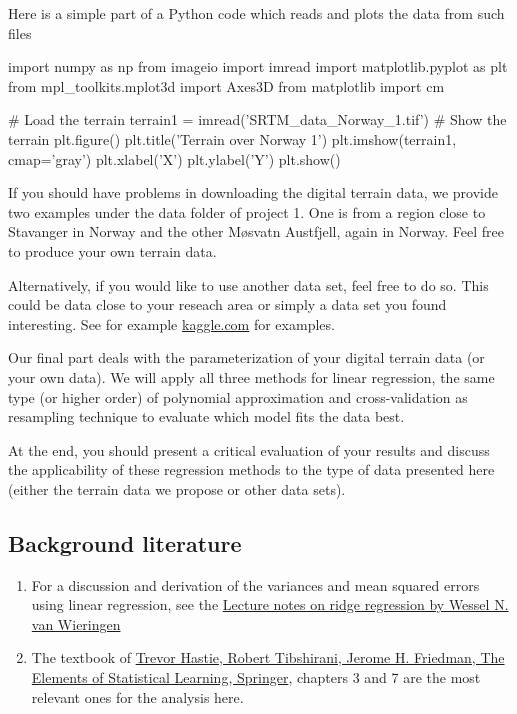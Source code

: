 \documentclass[%
oneside,                 %
final,                   %
10pt]{article}
\begin{document}
Here is a simple part of a Python code which reads and plots the data
from such files

\bpycod
import numpy as np
from imageio import imread
import matplotlib.pyplot as plt
from mpl_toolkits.mplot3d import Axes3D
from matplotlib import cm

# Load the terrain
terrain1 = imread('SRTM_data_Norway_1.tif')
# Show the terrain
plt.figure()
plt.title('Terrain over Norway 1')
plt.imshow(terrain1, cmap='gray')
plt.xlabel('X')
plt.ylabel('Y')
plt.show()
\epycod

If you should have problems in downloading the digital terrain data,
we provide two examples under the data folder of project 1. One is
from a region close to Stavanger in Norway and the other Møsvatn
Austfjell, again in Norway.
Feel free to produce your own terrain data.


Alternatively, if you would like to use another data set, feel free to do so. This could be data close to your reseach area or simply a data set you found interesting. See for example \href{{https://www.kaggle.com/datasets}}{kaggle.com} for examples.


Our final part deals with the parameterization of your digital terrain
data (or your own data).  We will apply all three methods for linear regression, the same type (or higher order) of polynomial
approximation and cross-validation as resampling technique to evaluate which
model fits the data best.

At the end, you should present a critical evaluation of your results
and discuss the applicability of these regression methods to the type
of data presented here (either the terrain data we propose or other data sets).




\subsection{Background literature}

\begin{enumerate}
\item For a discussion and derivation of the variances and mean squared errors using linear regression, see the \href{{https://arxiv.org/abs/1509.09169}}{Lecture notes on ridge regression by Wessel N. van Wieringen}

\item The textbook of \href{{https://www.springer.com/gp/book/9780387848570}}{Trevor Hastie, Robert Tibshirani, Jerome H. Friedman, The Elements of Statistical Learning, Springer}, chapters 3 and 7 are the most relevant ones for the analysis here. 
\end{enumerate}
\end{document}
